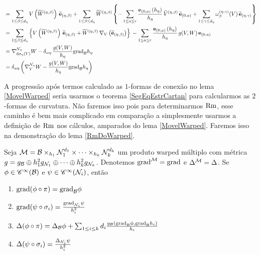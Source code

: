 \begin{demm}
\begin{align*}
&=  \sum_{1 \leq \beta \leq d_{\eta}}  V\left( \widetilde{W}^{(\eta, \beta)}  \right) \, \widetilde{\mathbf{e}}_{(\eta, \beta)} + \sum_{1 \leq \beta \leq d_{\eta}} \widetilde{W}^{(\eta, \beta)} \left\{-\sum_{1 \leq a \leq r} \frac{\mathbf{e}_{(0, a)}\left( h_{\eta} \right)}{h_{\eta}} \, \widetilde{V}^{(\eta, \beta)} \,  \widetilde{\mathbf{e}}_{(0, a)} + \sum_{1 \leq \gamma \leq d_{\eta}}\omega^{(\eta, \gamma)}_{\beta}(V) \, \widetilde{\mathbf{e}}_{(\eta, \gamma)} \right\} \\
&= \sum_{1 \leq \beta \leq d_{\eta}}  \left\{  V\left( \widetilde{W}^{(\eta, \beta)}  \right) \, \widetilde{\mathbf{e}}_{(\eta, \beta)} + \widetilde{W}^{(\eta, \beta)} \, \nabla_V \left( \widetilde{\mathbf{e}}_{(\eta, \beta)} \right) \right\}\, - \sum_{1 \leq a \leq r} \frac{\mathbf{e}_{(0, a)}\left( h_{\eta} \right)}{h_{\eta}} \, g(V, W) \, \mathbf{e}_{(0, a)} \\
&= \nabla^{\mathcal{N}_{\eta}}_{ \mathrm{d} \sigma_{\eta}(V)} W - \delta_{\alpha \eta } \, \frac{g(V, W)}{h_{\eta}} \text{grad}_{\mathcal{B}} h_{\eta} \\
&=\delta_{\alpha \eta} \left( \nabla^{\mathcal{N}_{\eta}}_V W - \frac{g(V, W)}{h_{\eta}} \text{grad}_{\mathcal{B}} h_{\eta} \right)
\end{align*}
\end{demm}
\begin{oobs}
A progressão  após termos calculado as $1$-formas de conexão no lema \cref{MovelWarped} seria usarmos o teorema \cref{SegEqEstrCartan} para calcularmos as $2$-formas de curvatura. Não faremos isso pois para determinarmos $\mathrm{Rm}$, esse caminho é bem mais complicado em comparação a simplesmente usarmos a definição de $\mathrm{Rm}$ nos cálculos, amparados do lema \cref{MovelWarped}. Faremos isso na demonstração do lema \cref{RmDoWarped}.
\end{oobs}

\begin{lema}\label{ConexWarped}
Seja $\mathcal{M} = \mathcal{B} \times_{h_1} \mathcal{N}_1^{d_1} \times \cdots \times_{h_k} \mathcal{N}_{k}^{d_k}$ um produto warped múltiplo com métrica $g = g_{\mathcal{B}} \oplus h_1^2 g_{\mathcal{N}_1} \oplus \cdots \oplus h_{k}^2 g_{\mathcal{N}_k}$. Denotemos $\text{grad}^{\mathcal{M}}= \text{grad}$ e $\Delta^{\mathcal{M}} = \Delta$. Se $\phi \in \mathscr{C}^{\infty}(\mathcal{B})$ e $\psi \in \mathscr{C}^{\infty}(\mathcal{N}_i)$, então
\begin{enumerate}[label=\color{blue}\normalfont\textbf{(\theenumi)}]
\item\label{GradPrimeiro} $\text{grad}(\phi \circ \pi) = \text{grad}_{\mathcal{B}} \phi$
\item $\text{grad}(\psi \circ \sigma_i) = \frac{\text{grad}_{\mathcal{N}_i} \psi}{h_i^2}$
\item $\Delta(\phi \circ \pi) = \Delta_{\mathcal{B}} \phi + \sum_{1 \leq i \leq k} d_i \frac{g_{\mathcal{B}}\left(\text{grad}_{\mathcal{B}} \phi, \text{grad}_{\mathcal{B}} h_i \right)}{h_i}$
\item $\Delta(\psi \circ \sigma_i) = \frac{\Delta_{\mathcal{N}_i} \psi}{h_i^2}$
\end{enumerate}
\end{lema}

